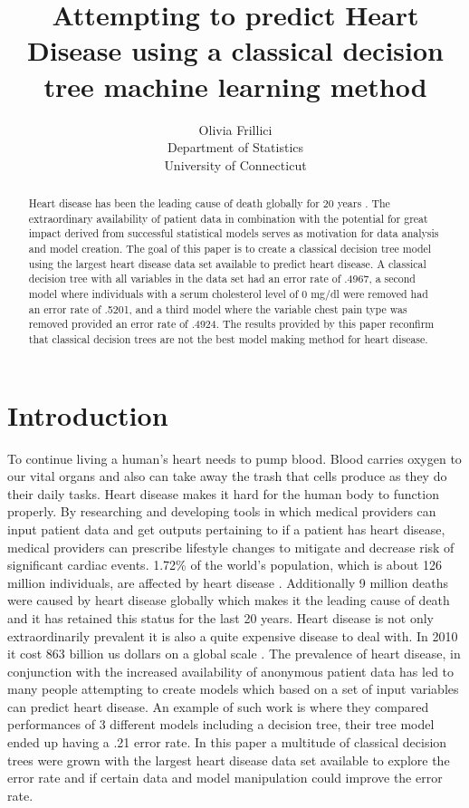 \documentclass[12pt]{article}
\title{Attempting to predict Heart Disease using a classical decision tree machine learning method }
\author{Olivia Frillici\\
  Department of Statistics\\
  University of Connecticut
}
\begin{document}
\maketitle
\begin{abstract}
  Heart disease has been the leading cause of death globally for 20 years \citep{}. The extraordinary availability of patient data in combination with the potential for great impact derived from successful statistical models serves as motivation for data analysis and model creation. The goal of this paper is to create a classical decision tree model using the largest heart disease data set available to predict heart disease. A classical decision tree with all variables in the data set had an error rate of .4967, a second model where individuals with a serum cholesterol level of 0 mg/dl were removed had an error rate of .5201, and a third model where the variable chest pain type was removed provided an error rate of .4924. The results provided by this paper reconfirm that classical decision trees are not the best model making method for heart disease. 
    \end{abstract}
    
    
    \section{Introduction}
    \label{sec:intro}
    
    To continue living a human’s heart needs to pump blood. Blood carries oxygen to our vital organs and also can take away the trash that cells produce as they do their daily tasks. Heart disease makes it hard for the human body to function properly. By researching and developing tools in which medical providers can input patient data and get outputs pertaining to if a patient has heart disease, medical providers can prescribe lifestyle changes to mitigate and decrease risk of significant cardiac events. 
1.72\% of the world’s population, which is about 126 million individuals, are affected by heart disease \citep{}. Additionally 9 million deaths were caused by heart disease globally which makes it the leading cause of death and it has retained this status for the last 20 years\citep{}. Heart disease is not only extraordinarily prevalent it is also a quite expensive disease to deal with. In 2010 it cost 863 billion us dollars on a global scale \citep{}. 
The prevalence of heart disease, in conjunction with the increased availability of anonymous patient data has led to many people attempting to create models which based on a set of input variables can predict heart disease. An example of such work is \citet{} where they compared performances of 3 different models including a decision tree, their tree model ended up having a .21 error rate. 
In this paper a multitude of classical decision trees were grown with the largest heart disease data set available to explore the error rate and if certain data and model manipulation could improve the error rate.
\end{document}
